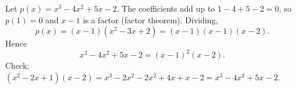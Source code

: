 Let $p(x)=x^3-4x^2+5x-2$. The coefficients add up to $1-4+5-2=0$, so $p(1)=0$ and $x-1$ is a factor (factor theorem). Dividing,
\[
p(x)=(x-1)\left(x^2-3x+2\right)=(x-1)(x-1)(x-2).
\]
Hence
\[
x^3-4x^2+5x-2=\boxed{(x-1)^2(x-2)} .
\]
Check: $(x^2-2x+1)(x-2)=x^3-2x^2-2x^2+4x+x-2=x^3-4x^2+5x-2$.
